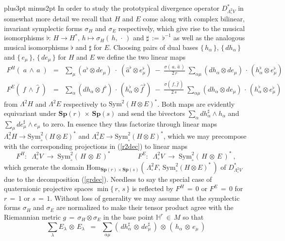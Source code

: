 \documentclass[12pt]{article}
\def\#{\sharp}
\def\b{\flat}
\def\H{\mathbb{H}}
\def\Hom{\mathrm{Hom}}
\def\L{\Lambda}
\def\pfill{\vskip6pt plus3pt minus2pt\noindent}
\def\S{\mathrm{Sym}}
\def\Sp{\mathbf{Sp}}
\begin{document}
 \pfill
 In order to study the prototypical divergence operator $D^*_{\L^2_\circ V}$
 in somewhat more detail we recall that $H$ and $E$ come along with complex
 bilinear, invariant symplectic forms $\sigma_H$ and $\sigma_E$ respectively,
 which give rise to the musical isomorphisms $\b:\,H\longrightarrow H^*,\,
 h\longmapsto\sigma_H(\,h,\,\cdot\,)$ and $\#\,:=\,\b^{-1}$ as well as the
 analogous musical isomorphisms $\b$ and $\#$ for $E$. Choosing pairs of
 dual bases $\{\,h_\alpha\,\}$, $\{\,dh_\alpha\,\}$ and $\{\,e_\mu\,\}$,
 $\{\,de_\mu\,\}$ for $H$ and $E$ we define the two linear maps
 \begin{eqnarray*}
  F^H(\;a\,\wedge\,\hat a\;)
  &=&
  \sum_\mu
  (a^\b\otimes de_\mu)\;\cdot\;(\hat a^\b\otimes e^\b_\mu)
  \;-\;\frac{\sigma(\,a,\,\hat a\,)}{2\,r}\;\sum_{\alpha\mu}
  (dh_\alpha\otimes de_\mu)\,\cdot\,(h^\b_\alpha\otimes e^\b_\mu)
  \\
  F^E(\;f\,\wedge\,\hat f\;)
  &=&
  \sum_\alpha
  (dh_\alpha\otimes f^\b)\,\cdot\,(h^\b_\alpha\otimes\hat f^\b)
  \;-\;\frac{\sigma(\,f,\hat f\,)}{2\,s}\;\sum_{\alpha\mu}
  (dh_\alpha\otimes de_\mu)\,\cdot\,(h^\b_\alpha\otimes e^\b_\mu)
 \end{eqnarray*}
 from $\L^2H$ and $\L^2E$ respectively to $\S^2(H\otimes E)^*$. Both
 maps are evidently equivariant under $\Sp(r)\,\times\,\Sp(s)$ and
 send the bivectors $\sum_\alpha dh^\#_\alpha\wedge h_\alpha$ and
 $\sum_\mu de^\#_\mu\wedge e_\mu$ to zero. In essence they thus
 factorize through linear maps $\L^2_\circ H\longrightarrow\S^2_\circ
 (H\otimes E)^*$ and $\L^2_\circ E\longrightarrow\S^2_\circ(H\otimes E)^*$,
 which we may precompose with the corresponding projections in (\ref{r2dec})
 to linear maps
 $$
  F^H:\;\;\L^2_\circ V\;\longrightarrow\;\S^2_\circ(\,H\,\otimes\,E\,)^*
  \qquad\qquad
  F^E:\;\;\L^2_\circ V\;\longrightarrow\;\S^2_\circ(\,H\,\otimes\,E\,)^*\ ,
 $$
 which generate the domain $\Hom_{\Sp(r)\times\Sp(s)}(\,\L^2_\circ F,
 \,\S^2_\circ(H\otimes E)^*\,)$ of $D^*_{\L^2_\circ V}$ due to the
 decomposition (\ref{grdec}). Needless to say the special case of
 quaternionic projective spaces $\min\{\,r,\,s\,\}$ is reflected by
 $F^H\,=\,0$ or $F^E\,=\,0$ for $r\,=\,1$ or $s\,=\,1$. Without loss
 of generality we may assume that the symplectic forms $\sigma_H$ and
 $\sigma_E$ are normalized to make their tensor product agree with the
 Riemannian metric $g\,=\,\sigma_H\otimes\sigma_E$ in the base point
 $\H^r\,\in\,M$ so that
 $$
  \sum_\lambda E_\lambda\,\otimes\,E_\lambda
  \;\;=\;\;
  \sum_{\alpha\mu}(\,dh^\#_\alpha\,\otimes\,de^\#_\mu\,)\,\otimes\,
  (\,h_\alpha\,\otimes\,e_\mu\,)
 $$
\end{document}
